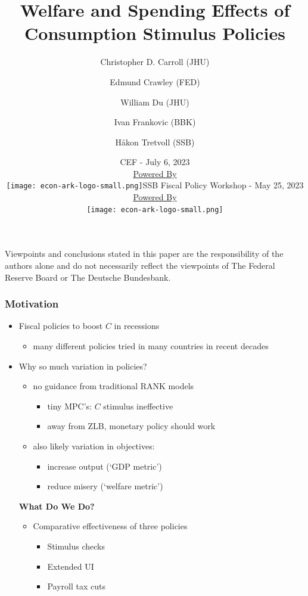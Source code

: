 \documentclass[pdflatex,aspectratio=169]{beamer}
\title[Stimulus]{Welfare and Spending Effects of Consumption Stimulus Policies}
\author{
  Christopher D.
Carroll (JHU)
  \and
  Edmund Crawley (FED)
  \and
  William Du (JHU)
  \and
  Ivan Frankovic (BBK)
  \and
  H{\aa}kon Tretvoll (SSB)
}
\date[\today]{CEF - July 6, 2023  \\ \medskip \medskip \medskip
        \href{https://econ-ark.org/}{\small Powered By} \\ \texttt{[image: econ-ark-logo-small.png]}}}{}
\date[\today]{SSB Fiscal Policy Workshop - May 25, 2023  \\ \medskip \medskip \medskip 
          \href{https://econ-ark.org/}{\small Powered By} \\ \texttt{[image: econ-ark-logo-small.png]}}}{}
\begin{document}


\begin{frame}[plain]
  \titlepage
  
  \footnotesize{Viewpoints and conclusions stated in this paper are the responsibility of the authors alone
    and do not necessarily reflect the viewpoints of The Federal Reserve Board or The Deutsche Bundesbank.}
\end{frame}




\begin{frame}
  \frametitle{Motivation}
  \begin{itemize}[<+->]
  \item Fiscal policies to boost $C$ in recessions
    \begin{itemize}[<+->]
    \item many different policies tried in many countries in recent decades  
    \end{itemize}
  \item Why so much variation in policies?

    \begin{itemize}[<+->]
      \itemsep = .25\bigskipamount 
    \item no guidance from traditional RANK models	
      \begin{itemize}[<+->]
      \item tiny MPC's: $C$ stimulus ineffective
      \item away from ZLB, monetary policy should work
      \end{itemize}
    \item also likely variation in objectives:
      \begin{itemize}[<+->]
      \item increase output (`GDP metric')
      \item reduce misery (`welfare metric')
      \end{itemize}
    \end{itemize}
    \bigskip
    \pause
  \textbf{What Do We Do?}
  \begin{itemize}[<+->]
    \item Comparative effectiveness of three policies
    \begin{itemize}[<+->]
      \item Stimulus checks
      \item Extended UI
      \item Payroll tax cuts
      \end{itemize}
  \end{itemize}
\end{itemize}
\end{frame}
\end{document}
